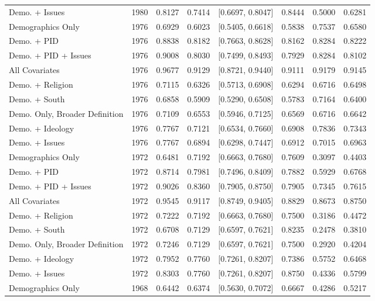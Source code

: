 \begin{longtable}{lrrrlrrr}
  Demo. + Issues & 1980 & 0.8127 & 0.7414 & [0.6697, 0.8047] & 0.8444 & 0.5000 & 0.6281 \\ 
  Demographics Only & 1976 & 0.6929 & 0.6023 & [0.5405, 0.6618] & 0.5838 & 0.7537 & 0.6580 \\ 
  Demo. + PID & 1976 & 0.8838 & 0.8182 & [0.7663, 0.8628] & 0.8162 & 0.8284 & 0.8222 \\ 
  Demo. + PID + Issues & 1976 & 0.9008 & 0.8030 & [0.7499, 0.8493] & 0.7929 & 0.8284 & 0.8102 \\ 
  All Covariates & 1976 & 0.9677 & 0.9129 & [0.8721, 0.9440] & 0.9111 & 0.9179 & 0.9145 \\ 
  Demo. + Religion & 1976 & 0.7115 & 0.6326 & [0.5713, 0.6908] & 0.6294 & 0.6716 & 0.6498 \\ 
  Demo. + South & 1976 & 0.6858 & 0.5909 & [0.5290, 0.6508] & 0.5783 & 0.7164 & 0.6400 \\ 
  Demo. Only, Broader Definition & 1976 & 0.7109 & 0.6553 & [0.5946, 0.7125] & 0.6569 & 0.6716 & 0.6642 \\ 
  Demo. + Ideology & 1976 & 0.7767 & 0.7121 & [0.6534, 0.7660] & 0.6908 & 0.7836 & 0.7343 \\ 
  Demo. + Issues & 1976 & 0.7767 & 0.6894 & [0.6298, 0.7447] & 0.6912 & 0.7015 & 0.6963 \\ 
  Demographics Only & 1972 & 0.6481 & 0.7192 & [0.6663, 0.7680] & 0.7609 & 0.3097 & 0.4403 \\ 
  Demo. + PID & 1972 & 0.8714 & 0.7981 & [0.7496, 0.8409] & 0.7882 & 0.5929 & 0.6768 \\ 
  Demo. + PID + Issues & 1972 & 0.9026 & 0.8360 & [0.7905, 0.8750] & 0.7905 & 0.7345 & 0.7615 \\ 
  All Covariates & 1972 & 0.9545 & 0.9117 & [0.8749, 0.9405] & 0.8829 & 0.8673 & 0.8750 \\ 
  Demo. + Religion & 1972 & 0.7222 & 0.7192 & [0.6663, 0.7680] & 0.7500 & 0.3186 & 0.4472 \\ 
  Demo. + South & 1972 & 0.6708 & 0.7129 & [0.6597, 0.7621] & 0.8235 & 0.2478 & 0.3810 \\ 
  Demo. Only, Broader Definition & 1972 & 0.7246 & 0.7129 & [0.6597, 0.7621] & 0.7500 & 0.2920 & 0.4204 \\ 
  Demo. + Ideology & 1972 & 0.7952 & 0.7760 & [0.7261, 0.8207] & 0.7386 & 0.5752 & 0.6468 \\ 
  Demo. + Issues & 1972 & 0.8303 & 0.7760 & [0.7261, 0.8207] & 0.8750 & 0.4336 & 0.5799 \\ 
  Demographics Only & 1968 & 0.6442 & 0.6374 & [0.5630, 0.7072] & 0.6667 & 0.4286 & 0.5217 \\ 

\end{longtable}
